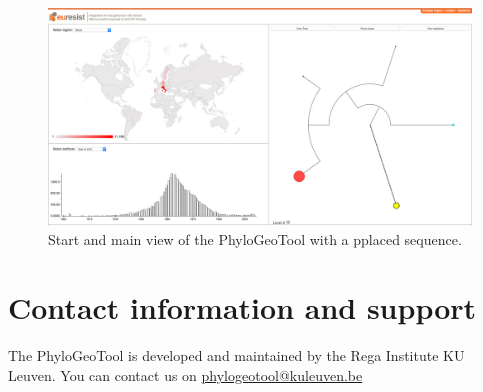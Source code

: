 \documentclass[a4paper, 11pt]{article} %
\begin{document}
\begin{figure}[H]
\centering
\includegraphics[scale=0.1875]{images/pplaced_sequence.png}
\vspace{-0.75cm}
\caption{Start and main view of the PhyloGeoTool with a pplaced sequence.}
\label{fig:pplacer-view}
\end{figure}






\section{Contact information and support }

The PhyloGeoTool is developed and maintained by the Rega Institute KU Leuven.
You can contact us on \href{mailto:phylogeotool@kuleuven.be}{phylogeotool@kuleuven.be}





\end{document}
